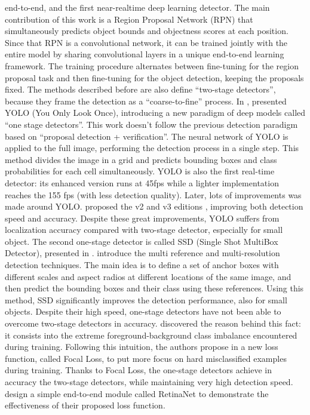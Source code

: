  end-to-end, and the first near-realtime deep learning detector. The main contribution of this work is a Region Proposal Network (RPN) that simultaneously predicts object bounds and objectness scores at each position. Since that RPN is a convolutional network, it can be trained jointly with the entire model by sharing convolutional layers in a unique end-to-end learning framework. The training procedure alternates between fine-tuning for the region proposal task and then fine-tuning for the object detection, keeping the proposals fixed. The methods described before are also define ``two-stage detectors'', because they frame the detection as a ``coarse-to-fine'' process. In \cite{yolo}, \citeauthor{yolo} presented YOLO (You Only Look Once), introducing a new paradigm of deep models called ``one stage detectors''. This work doesn't follow the previous detection paradigm based on ``proposal detection + verification''. The neural network of YOLO is applied to the full image, performing the detection process in a single step. This method divides the image in a grid and predicts bounding boxes and class probabilities for each cell simultaneously. YOLO is also the first real-time detector: its enhanced version runs
 at 45fps while a lighter implementation reaches the 155 fps (with less detection quality).  Later, lots of improvements was made around YOLO. \citeauthor{yolov2} proposed the v2 and v3 editions \cite{yolov2, yolov3}, improving both detection speed and accuracy. Despite these great improvements, YOLO suffers from localization accuracy compared with two-stage detector, especially for small object. The second one-stage detector is called SSD (Single Shot MultiBox Detector), presented in \cite{ssd}. \citeauthor{ssd} introduce the multi reference and multi-resolution detection techniques. The main idea is to define a set of anchor boxes with different scales and aspect radios at different locations of the same image, and then predict the bounding boxes and their class using these references. Using this method, SSD significantly improves the detection performance, also for small objects. Despite their high speed, one-stage detectors have not been able to overcome two-stage detectors in accuracy. \citeauthor{focalloss} discovered the reason behind this fact: it consists into the extreme foreground-background class imbalance encountered during training. Following this intuition, the authors propose in \cite{focalloss} a new loss function, called Focal Loss, to put more focus on hard misclassified examples during training. Thanks to Focal Loss, the one-stage detectors achieve in accuracy the two-stage detectors, while maintaining very high detection speed. \citeauthor{focalloss} design a simple end-to-end module called RetinaNet to demonstrate the effectiveness of their proposed loss function.